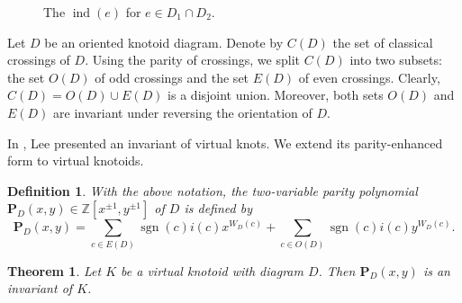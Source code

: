 \documentclass[10pt,a4paper]{amsart}
\newtheorem{theorem}{Theorem}[section]
\newtheorem{definition}{Definition}[section]
\numberwithin{equation}{section}
\numberwithin{equation}{section}
\begin{document}
\begin{figure}[htbp]
\begin{center}
		\caption{The $\operatorname{ind}(e)$ for $e \in D_1 \cap D_2$.} \label{fig511}
	\end{center}
\end{figure}

Let $D$ be an oriented knotoid diagram. Denote by $C(D)$ the set of classical crossings of $D$. Using the parity of crossings, we split $C(D)$ into two subsets: the set $O(D)$ of odd crossings and the set $E(D)$ of even crossings. Clearly, $C(D) = O(D) \cup E(D)$ is a disjoint union. Moreover, both sets $O(D)$ and $E(D)$ are invariant under reversing the orientation of $D$.

In \cite[Thm. 2.6]{Lee}, Lee presented an invariant of virtual knots. We extend its parity-enhanced form to virtual knotoids. 

\begin{definition} \label{def2.1}
	{\rm 
		With the above notation, \textit{the two-variable parity polynomial} $\mathbf{P}_D(x,y) \in \mathbb Z[x^{\pm 1}, y^{\pm 1}]$ of $D$ is defined by	
		$$
		\mathbf{P}_D(x,y)=\sum_{c \in E(D)} \operatorname{sgn}(c) i(c) x^{W_D(c)} + \sum_{c \in O(D)} \operatorname{sgn}(c) i(c) y^{W_D(c)}. 
		$$
	}
\end{definition}

\begin{theorem} \label{th2.1}
	Let $K$ be a virtual knotoid with diagram $D$. Then $\mathbf{P}_D(x,y)$ is an invariant of $K$.
\end{theorem}
\end{document}
